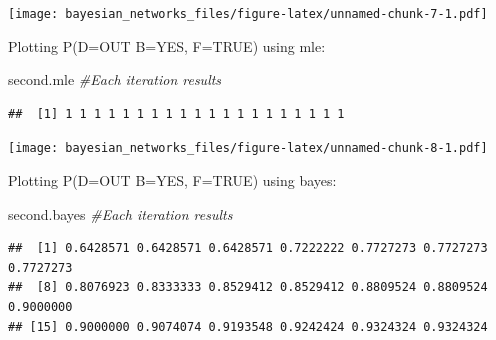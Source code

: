 \documentclass[
]{article}
\newenvironment{Shaded}{\begin{snugshade}}{\end{snugshade}}
\newcommand{\AttributeTok}[1]{\textcolor[rgb]{0.77,0.63,0.00}{#1}}
\newcommand{\CommentTok}[1]{\textcolor[rgb]{0.56,0.35,0.01}{\textit{#1}}}
\newcommand{\DecValTok}[1]{\textcolor[rgb]{0.00,0.00,0.81}{#1}}
\newcommand{\FunctionTok}[1]{\textcolor[rgb]{0.00,0.00,0.00}{#1}}
\newcommand{\NormalTok}[1]{#1}
\newcommand{\OtherTok}[1]{\textcolor[rgb]{0.56,0.35,0.01}{#1}}
\newcommand{\SpecialCharTok}[1]{\textcolor[rgb]{0.00,0.00,0.00}{#1}}
\newcommand{\StringTok}[1]{\textcolor[rgb]{0.31,0.60,0.02}{#1}}
\begin{document}
\texttt{[image: bayesian\_networks\_files/figure-latex/unnamed-chunk-7-1.pdf]}

Plotting P(D=OUT \textbar{} B=YES, F=TRUE) using mle:

\begin{Shaded}
\begin{Highlighting}[]
\NormalTok{second.mle }\CommentTok{\#Each iteration results}
\end{Highlighting}
\end{Shaded}

\begin{verbatim}
##  [1] 1 1 1 1 1 1 1 1 1 1 1 1 1 1 1 1 1 1 1 1
\end{verbatim}

\begin{Shaded}
\end{Shaded}

\texttt{[image: bayesian\_networks\_files/figure-latex/unnamed-chunk-8-1.pdf]}

Plotting P(D=OUT \textbar{} B=YES, F=TRUE) using bayes:

\begin{Shaded}
\begin{Highlighting}[]
\NormalTok{second.bayes }\CommentTok{\#Each iteration results}
\end{Highlighting}
\end{Shaded}

\begin{verbatim}
##  [1] 0.6428571 0.6428571 0.6428571 0.7222222 0.7727273 0.7727273 0.7727273
##  [8] 0.8076923 0.8333333 0.8529412 0.8529412 0.8809524 0.8809524 0.9000000
## [15] 0.9000000 0.9074074 0.9193548 0.9242424 0.9324324 0.9324324
\end{verbatim}
\end{document}
